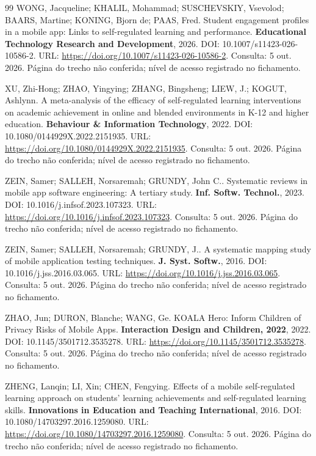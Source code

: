 \begin{thebibliography}{99}
 WONG, Jacqueline; KHALIL, Mohammad; SUSCHEVSKIY, Vsevolod; BAARS, Martine; KONING, Bjorn de; PAAS, Fred. Student engagement profiles in a mobile app: Links to self-regulated learning and performance. \textbf{Educational Technology Research and Development}, 2026. DOI: 10.1007/s11423-026-10586-2. URL: \url{https://doi.org/10.1007/s11423-026-10586-2}. Consulta: 5 out. 2026. Página do trecho não conferida; nível de acesso registrado no fichamento.

 XU, Zhi-Hong; ZHAO, Yingying; ZHANG, Bingsheng; LIEW, J.; KOGUT, Ashlynn. A meta-analysis of the efficacy of self-regulated learning interventions on academic achievement in online and blended environments in K-12 and higher education. \textbf{Behaviour \& Information Technology}, 2022. DOI: 10.1080/0144929X.2022.2151935. URL: \url{https://doi.org/10.1080/0144929X.2022.2151935}. Consulta: 5 out. 2026. Página do trecho não conferida; nível de acesso registrado no fichamento.

 ZEIN, Samer; SALLEH, Norsaremah; GRUNDY, John C.. Systematic reviews in mobile app software engineering: A tertiary study. \textbf{Inf. Softw. Technol.}, 2023. DOI: 10.1016/j.infsof.2023.107323. URL: \url{https://doi.org/10.1016/j.infsof.2023.107323}. Consulta: 5 out. 2026. Página do trecho não conferida; nível de acesso registrado no fichamento.

 ZEIN, Samer; SALLEH, Norsaremah; GRUNDY, J.. A systematic mapping study of mobile application testing techniques. \textbf{J. Syst. Softw.}, 2016. DOI: 10.1016/j.jss.2016.03.065. URL: \url{https://doi.org/10.1016/j.jss.2016.03.065}. Consulta: 5 out. 2026. Página do trecho não conferida; nível de acesso registrado no fichamento.

 ZHAO, Jun; DURON, Blanche; WANG, Ge. KOALA Hero: Inform Children of Privacy Risks of Mobile Apps. \textbf{Interaction Design and Children, 2022}, 2022. DOI: 10.1145/3501712.3535278. URL: \url{https://doi.org/10.1145/3501712.3535278}. Consulta: 5 out. 2026. Página do trecho não conferida; nível de acesso registrado no fichamento.

 ZHENG, Lanqin; LI, Xin; CHEN, Fengying. Effects of a mobile self-regulated learning approach on students’ learning achievements and self-regulated learning skills. \textbf{Innovations in Education and Teaching International}, 2016. DOI: 10.1080/14703297.2016.1259080. URL: \url{https://doi.org/10.1080/14703297.2016.1259080}. Consulta: 5 out. 2026. Página do trecho não conferida; nível de acesso registrado no fichamento.

\end{thebibliography}